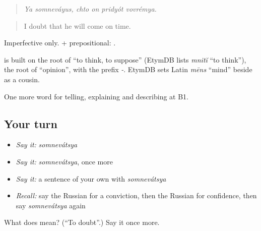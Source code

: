 \begin{quote}
\emph{Ya somneváyus, chto on pridyót vovrémya.}
\end{quote}

\begin{quote}
I doubt that he will come on time.
\end{quote}

Imperfective only. \emph{ } + prepositional: \emph{   }.

\begin{cousinweb}
\textbf{} is built on the root of \emph{} \textquotedblleft{}to think, to suppose\textquotedblright{} (EtymDB lists \emph{mnitĭ} \textquotedblleft{}to think\textquotedblright{}), the root of \emph{} \textquotedblleft{}opinion\textquotedblright{}, with the prefix \emph{-}. EtymDB sets Latin \emph{mēns} \textquotedblleft{}mind\textquotedblright{} beside \emph{} as a cousin.
\end{cousinweb}

\begin{grammarlens}[title={What you've built}]
One more word for telling, explaining and describing at B1.
\end{grammarlens}

\subsection*{Your turn}
\begin{itemize}
\raggedright
  \item \emph{Say it:} \emph{somnevátsya}
  \item \emph{Say it:} \emph{somnevátsya}, once more
  \item \emph{Say it:} a sentence of your own with \emph{somnevátsya}
  \item \emph{Recall:} say the Russian for a conviction, then the Russian for confidence, then say \emph{somnevátsya} again
\end{itemize}

\begin{tcolorbox}[breakable,colback=teal!4,colframe=teal!35!black,title={Before you move on}]
What does  mean? (\textquotedblleft{}To doubt\textquotedblright{}.) Say it once more.
\end{tcolorbox}
